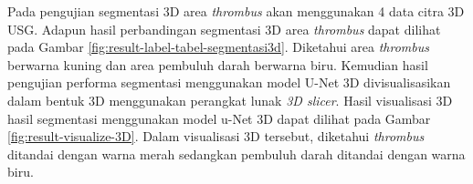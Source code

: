 
Pada pengujian segmentasi 3D area \textit{thrombus} akan menggunakan 4 data citra 3D USG. Adapun hasil perbandingan segmentasi 3D area \textit{thrombus} dapat dilihat pada Gambar \ref{fig:result-label-tabel-segmentasi3d}. Diketahui area \textit{thrombus} berwarna kuning dan area pembuluh darah berwarna biru. Kemudian hasil pengujian performa segmentasi menggunakan model U-Net 3D divisualisasikan dalam bentuk 3D menggunakan perangkat lunak \textit{3D slicer}. Hasil visualisasi 3D hasil segmentasi menggunakan model u-Net 3D dapat dilihat pada Gambar \ref{fig:result-visualize-3D}. Dalam visualisasi 3D tersebut, diketahui \textit{thrombus} ditandai dengan warna merah sedangkan pembuluh darah ditandai dengan warna biru.



